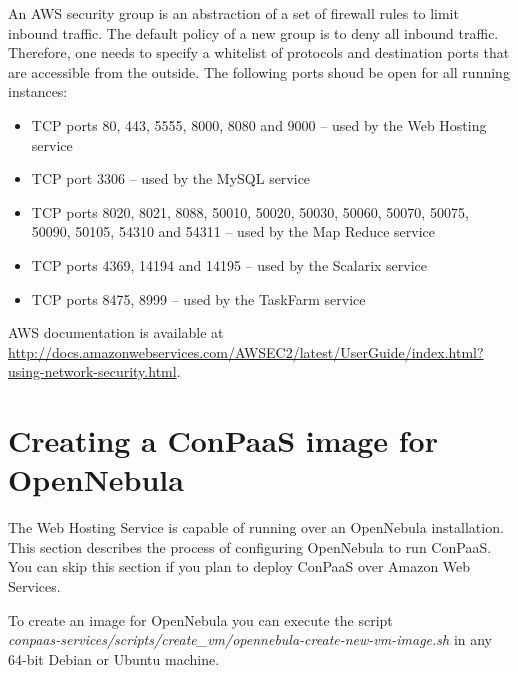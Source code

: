 \documentclass[10pt]{article}
\begin{document}
An AWS security group is an abstraction of a set of firewall rules to
limit inbound traffic. The default policy of a new group is to deny
all inbound traffic. Therefore, one needs to specify a whitelist of
protocols and destination ports that are accessible from the outside. 
The following ports shoud be open for all running instances: 
\begin{itemize}
\item TCP ports 80, 443, 5555, 8000, 8080 and 9000 -- used by the Web Hosting service
\item TCP port 3306 -- used by the MySQL service
\item TCP ports 8020, 8021, 8088, 50010, 50020, 50030, 50060, 50070, 50075, 50090, 50105, 54310 and 54311 -- used by the Map Reduce service
\item TCP ports 4369, 14194 and 14195 -- used by the Scalarix service
\item TCP ports 8475, 8999 -- used by the TaskFarm service
\end{itemize}

AWS documentation is available at
\url{http://docs.amazonwebservices.com/AWSEC2/latest/UserGuide/index.html?using-network-security.html}.

\section{Creating a ConPaaS image for OpenNebula}
\label{sec:oneimage}

The Web Hosting Service is capable of running over an OpenNebula
installation. This section describes the process of configuring
OpenNebula to run ConPaaS. You can skip this section if you plan to
deploy ConPaaS over Amazon Web Services.

To create an image for OpenNebula you can execute the script\\
\textit{conpaas-services/scripts/create\_vm/opennebula-create-new-vm-image.sh} in any
64-bit Debian or Ubuntu machine.
\end{document}
